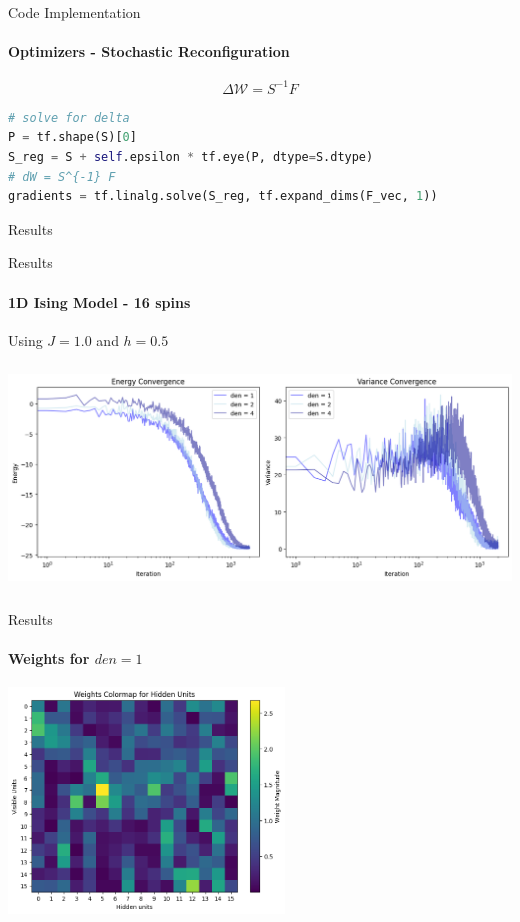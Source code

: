 \documentclass{beamer}
\begin{document}
\begin{frame}[fragile]{Code Implementation}
\framesubtitle{Optimizers - Stochastic Reconfiguration}
$$\Delta \mathcal{W} = S^{-1} F$$

\begin{lstlisting}[language=Python, style=kaolstplain]
# solve for delta
P = tf.shape(S)[0]
S_reg = S + self.epsilon * tf.eye(P, dtype=S.dtype)
# dW = S^{-1} F
gradients = tf.linalg.solve(S_reg, tf.expand_dims(F_vec, 1))
\end{lstlisting}
\end{frame}

\begin{chapter}{}{Results}
\end{chapter}

\begin{frame}{Results}
\framesubtitle{1D Ising Model - 16 spins}
Using $J = 1.0$ and $h=0.5$
\begin{center}
\includegraphics[height=6cm]{images/16spin_history_j1.png}
\end{center}
\end{frame}

\begin{frame}{Results}
\framesubtitle{Weights for $den = 1$}
\begin{center}
\includegraphics[height=6cm]{images/16spin_den1_j1.png}
\end{center}
\end{frame}
\end{document}
